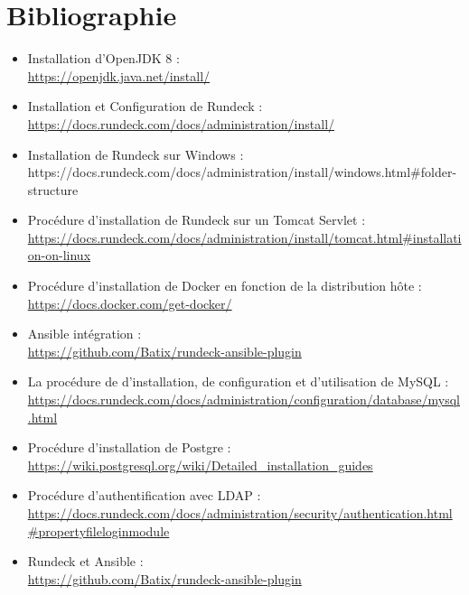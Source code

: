 \documentclass[12pt]{article}
\begin{document}
\section{Bibliographie}
\begin{itemize}
    \item Installation d'OpenJDK 8 :
    \\ \url{https://openjdk.java.net/install/}
    \item Installation et Configuration de Rundeck :
    \\ \url{https://docs.rundeck.com/docs/administration/install/}
    \item Installation de Rundeck sur Windows :
    \\ https://docs.rundeck.com/docs/administration/install/windows.html\#folder-structure
    \item Procédure d'installation de Rundeck sur un Tomcat Servlet :
    \\ \url{https://docs.rundeck.com/docs/administration/install/tomcat.html#installation-on-linux}
    \item Procédure d'installation de Docker en fonction de la distribution hôte : 
    \\ \url{https://docs.docker.com/get-docker/}
    \item Ansible intégration :
    \\ \url{https://github.com/Batix/rundeck-ansible-plugin}
    \item La procédure de d'installation, de configuration et d'utilisation de MySQL :
    \\ \url{https://docs.rundeck.com/docs/administration/configuration/database/mysql.html}
    \item Procédure d'installation de Postgre :
    \\ \url{https://wiki.postgresql.org/wiki/Detailed_installation_guides}
    \item Procédure d'authentification avec LDAP :
    \\ \url{https://docs.rundeck.com/docs/administration/security/authentication.html#propertyfileloginmodule}
    \item Rundeck et Ansible :
    \\ \url{https://github.com/Batix/rundeck-ansible-plugin}
\end{itemize}
\end{document}
